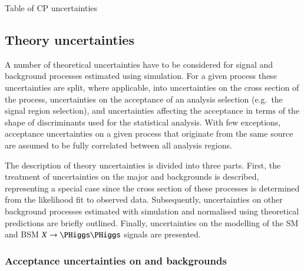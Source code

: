 \begin{table}[htbp]
  \centering

  \caption{Table of CP uncertainties}%
  \label{tab:experimental_uncertainties}

  
\end{table}




\subsection{Theory uncertainties}%
\label{sec:modelling_uncertainties}%
\label{sec:theory_uncertainties}

A number of theoretical uncertainties have to be considered for signal
and background processes estimated using simulation. For a given
process these uncertainties are split, where applicable, into
uncertainties on the cross section of the process, uncertainties on
the acceptance of an analysis selection (e.g.\ the signal region
selection), and uncertainties affecting the acceptance in terms of the
shape of discriminants used for the statistical analysis. With few
exceptions, acceptance uncertainties on a given process that originate
from the same source are assumed to be fully correlated between all
analysis regions.

The description of theory uncertainties is divided into three parts.
First, the treatment of uncertainties on the major \ZHF and \ttbar
backgrounds is described, representing a special case since the cross
section of these processes is determined from the likelihood fit to
observed data. Subsequently, uncertainties on other background
processes estimated with simulation and normalised using theoretical
predictions are briefly outlined. Finally, uncertainties on the
modelling of the SM \HH and BSM $X \to \HH$ signals are presented.

\subsubsection{Acceptance uncertainties on \ZHF and \ttbar backgrounds}

